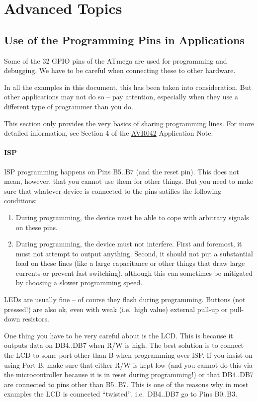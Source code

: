 \documentclass{article}
\newenvironment{note}{\begin{tcolorbox}[colback=blue!5!white,colframe=blue!75!black,title=\textbf{Note}]}{\end{tcolorbox}}
\begin{document}
\section{Advanced Topics}
\subsection{Use of the Programming Pins in Applications}
Some of the 32 GPIO pins of the ATmega are used for programming and debugging. We have to be careful when connecting these to other hardware. 

\begin{note}
In all the examples in this document, this has been taken into consideration. But other applications may not do so -- pay attention, especially when they use a different type of programmer than you do. 
\end{note}

This section only provides the very basics of sharing programming lines. For more detailed information, see Section 4 of the \href{https://ww1.microchip.com/downloads/en/appnotes/atmel-2521-avr-hardware-design-considerations_applicationnote_avr042.pdf}{AVR042} Application Note. 

\paragraph{ISP} ISP programming happens on Pins B5..B7 (and the reset pin). This does not mean, however, that you cannot use them for other things. But you need to make sure that whatever device is connected to the pins satifies the following conditions:
\begin{enumerate}
\item During programming, the device must be able to cope with arbitrary signals on these pins. 
\item During programming, the device must not interfere. First and foremost, it must not attempt to output anything. Second, it should not put a substantial load on these lines (like a large capacitance or other things that draw large currents or prevent fast switching), although this can sometimes be mitigated by choosing a slower programming speed. 
\end{enumerate}

LEDs are usually fine -- of course they flash during programming. Buttons (not pressed!) are also ok, even with weak (i.e.\ high \textOmega{} value) external pull-up or pull-down resistors. 

One thing you have to be very careful about is the LCD. This is because it outputs data on DB4..DB7 when R/W is high. The best solution is to connect the LCD to some port other than B when programming over ISP. 
If you insist on using Port B, make sure that either R/W is kept low (and you cannot do this via the microcontroller because it is in reset during programming!) or that DB4..DB7 are connected to pins other than B5..B7. This is one of the reasons why in most examples the LCD is connected ``twisted'', i.e.\ DB4..DB7 go to Pins B0..B3. 
\end{document}

